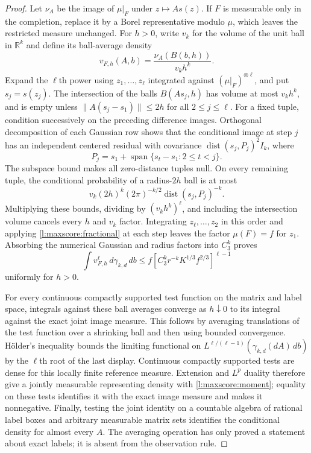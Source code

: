 \begin{proof}
Let \(\nu_A\) be the image of \(\mu|_F\) under \(z\mapsto As(z)\).
If \(F\) is measurable only in the completion, replace it by a Borel
representative modulo \(\mu\), which leaves the restricted measure
unchanged.
For \(h>0\), write \(v_k\) for the volume of the unit ball in
\(\mathbb R^k\) and define its ball-average density
\[
 v_{F,h}(A,b)=\frac{\nu_A(B(b,h))}{v_kh^k}.
\]
Expand the \(\ell\)th power using \(z_1,\ldots,z_\ell\) integrated
against \((\mu|_F)^{\otimes\ell}\), and put \(s_j=s(z_j)\).
The intersection of the balls \(B(As_j,h)\) has volume at most
\(v_kh^k\), and is empty unless
\(\|A(s_j-s_1)\|\le2h\) for all \(2\le j\le\ell\).
For a fixed tuple, condition successively on the preceding difference
images.  Orthogonal decomposition of each Gaussian row shows that the
conditional image at step \(j\) has an independent centered residual
with covariance
\(\operatorname{dist}(s_j,P_j)^2I_k\), where
\[
 P_j=s_1+\operatorname{span}\{s_t-s_1:2\le t<j\}.
\]
The subspace bound makes all zero-distance tuples null.  On every
remaining tuple, the conditional probability of a radius-\(2h\) ball
is at most
\[
 v_k(2h)^k(2\pi)^{-k/2}
 \operatorname{dist}(s_j,P_j)^{-k}.
\]
Multiplying these bounds, dividing by \((v_kh^k)^\ell\), and
including the intersection volume cancels every \(h\) and \(v_k\)
factor.  Integrating \(z_\ell,\ldots,z_2\) in this order and applying
\eqref{l:maxscore:fractional} at each step leaves the factor
\(\mu(F)=f\) for \(z_1\).  Absorbing the numerical Gaussian and
radius factors into \(C_3^k\) proves
\[
 \int v_{F,h}^\ell\,d\gamma_{k,d}\,db
 \le f[C_3^kr^{-k}K^{1/3}f^{2/3}]^{\ell-1}
\]
uniformly for \(h>0\).

For every continuous compactly supported test function on the matrix
and label space, integrals against these ball averages converge as
\(h\downarrow0\) to its integral against the exact joint image
measure.  This follows by averaging translations of the test function
over a shrinking ball and then using bounded convergence.  H\"older's
inequality bounds the limiting functional on
\(L^{\ell/(\ell-1)}(\gamma_{k,d}(dA)\,db)\) by the \(\ell\)th
root of the last display.  Continuous compactly supported tests are
dense for this locally finite reference measure.  Extension and
\(L^p\) duality therefore give a jointly measurable representing
density with \eqref{l:maxscore:moment}; equality on these tests
identifies it with the exact image measure and makes it nonnegative.
Finally, testing the joint identity on a countable algebra of rational
label boxes and arbitrary measurable matrix sets identifies the
conditional density for almost every \(A\).  The averaging operation
has only proved a statement about exact labels; it is absent from the
observation rule.
\end{proof}

